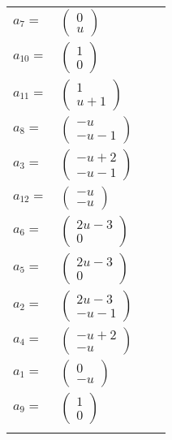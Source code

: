 \documentclass[1p]{elsarticle_modified}
\theoremstyle{definition}
\begin{document}
\begin{tabular}{m{7pt} m{180pt} m{7pt} m{180pt} }
\flushright $a_{7}=$&$\begin{pmatrix}0\\u\end{pmatrix}$ \\
\flushright $a_{10}=$&$\begin{pmatrix}1\\0\end{pmatrix}$ \\
\flushright $a_{11}=$&$\begin{pmatrix}1\\u+1\end{pmatrix}$ \\
\flushright $a_{8}=$&$\begin{pmatrix}- u\\- u-1\end{pmatrix}$ \\
\flushright $a_{3}=$&$\begin{pmatrix}- u+2\\- u-1\end{pmatrix}$ \\
\flushright $a_{12}=$&$\begin{pmatrix}- u\\- u\end{pmatrix}$ \\
\flushright $a_{6}=$&$\begin{pmatrix}2 u-3\\0\end{pmatrix}$ \\
\flushright $a_{5}=$&$\begin{pmatrix}2 u-3\\0\end{pmatrix}$ \\
\flushright $a_{2}=$&$\begin{pmatrix}2 u-3\\- u-1\end{pmatrix}$ \\
\flushright $a_{4}=$&$\begin{pmatrix}- u+2\\- u\end{pmatrix}$ \\
\flushright $a_{1}=$&$\begin{pmatrix}0\\- u\end{pmatrix}$ \\
\flushright $a_{9}=$&$\begin{pmatrix}1\\0\end{pmatrix}$\\&\end{tabular}
\end{document}
